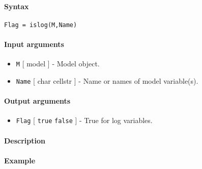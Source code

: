 


	\paragraph{Syntax}\label{syntax}

\begin{verbatim}
Flag = islog(M,Name)
\end{verbatim}

\paragraph{Input arguments}\label{input-arguments}

\begin{itemize}
\item
  \texttt{M} {[} model {]} - Model object.
\item
  \texttt{Name} {[} char \textbar{} cellstr {]} - Name or names of model
  variable(s).
\end{itemize}

\paragraph{Output arguments}\label{output-arguments}

\begin{itemize}
\itemsep1pt\parskip0pt
\item
  \texttt{Flag} {[} \texttt{true} \textbar{} \texttt{false} {]} - True
  for log variables.
\end{itemize}

\paragraph{Description}\label{description}

\paragraph{Example}\label{example}


